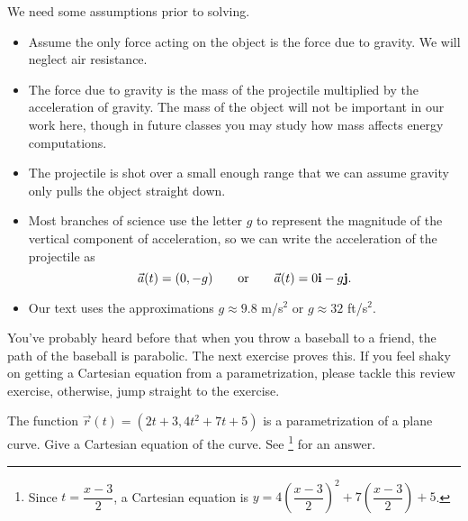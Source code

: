 We need some assumptions prior to solving. 
\begin{itemize}
 \item Assume the only force acting on the object is the force due to gravity. We will neglect air resistance. 
 \item The force due to gravity is the mass of the projectile multiplied by the acceleration of gravity. The mass of the object will not be important in our work here, though in future classes you may study how mass affects energy computations. 
 \item The projectile is shot over a small enough range that we can assume gravity only pulls the object straight down.
 \item Most branches of science use the letter $g$ to represent the magnitude of the vertical component of acceleration, so we can write the acceleration of the projectile as 
$$\vec a(t) = (0,-g) \quad \quad \text{or}\quad \quad \vec a(t)= 0{\bf i}-g{\bf j}.$$ 
 \item Our text uses the approximations $g\approx 9.8$ m/s$^2$ or $g\approx32$ ft/s$^2$. 
\end{itemize}


You've probably heard before that when you throw a baseball to a friend, the path of the baseball is parabolic. The next exercise proves this. If you feel shaky on getting a Cartesian equation from a parametrization, please tackle this review exercise, otherwise, jump straight to the exercise.
\begin{review*}
 The function $\vec r(t) = (2t+3, 4t^2+7t+5)$ is a parametrization of a plane curve.  Give a Cartesian equation of the curve. 
 See \footnote{Since $t=\dfrac{x-3}{2}$, a Cartesian equation is $y = 4\left(\dfrac{x-3}{2}\right)^2+7\left(\dfrac{x-3}{2}\right)+5$. } for an answer.
\end{review*}


